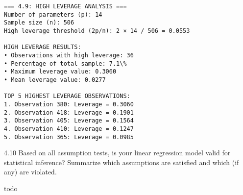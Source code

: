 \documentclass[11pt, twocolumn]{article}
\begin{document}
    \begin{Verbatim}[commandchars=\\\{\}]
=== 4.9: HIGH LEVERAGE ANALYSIS ===
Number of parameters (p): 14
Sample size (n): 506
High leverage threshold (2p/n): 2 × 14 / 506 = 0.0553

HIGH LEVERAGE RESULTS:
• Observations with high leverage: 36
• Percentage of total sample: 7.1\%
• Maximum leverage value: 0.3060
• Mean leverage value: 0.0277

TOP 5 HIGHEST LEVERAGE OBSERVATIONS:
1. Observation 380: Leverage = 0.3060
2. Observation 418: Leverage = 0.1901
3. Observation 405: Leverage = 0.1564
4. Observation 410: Leverage = 0.1247
5. Observation 365: Leverage = 0.0985

    \end{Verbatim}

    4.10 Based on all assumption tests, is your linear regression model
valid for statistical inference? Summarize which assumptions are
satisfied and which (if any) are violated.

todo
\end{document}
